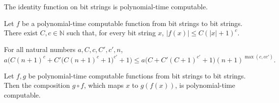 \begin{theorem}
\label{Complexity.polyTimeComputable_id}
\leanok
{}
The identity function on bit strings is polynomial-time computable.
\end{theorem}

\begin{theorem}
\label{Complexity.PolyTimeComputable.output_length_le}
\leanok
{}
Let $f$ be a polynomial-time computable function from bit strings to bit strings. There
exist $C,c\in\mathbb{N}$ such that, for every bit string $x$, $|f(x)|\le C(|x|+1)^c$.
\end{theorem}

\begin{lemma}
\label{Complexity.comp_time_bound}
\leanok
{}
For all natural numbers $a,C,c,C',c',n$,
\[a\bigl(C(n+1)^c+C'\bigl(C(n+1)^c+1\bigr)^{c'}+1\bigr)\le
a\bigl(C+C'(C+1)^{c'}+1\bigr)(n+1)^{\max(c,cc')} .\]
\end{lemma}

\begin{theorem}
\label{Complexity.PolyTimeComputable.comp}
\leanok
{}
Let $f,g$ be polynomial-time computable functions from bit strings to bit strings. Then
the composition $g\circ f$, which maps $x$ to $g(f(x))$, is polynomial-time computable.
\end{theorem}

